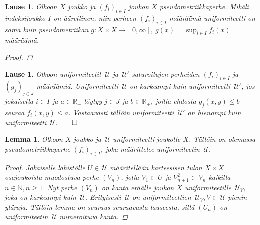 \documentclass[12pt,a4paper,leqno]{report}
\newcommand{\R}{\mathbb{R}}
\newcommand{\N}{\mathbb{N}}
\newcommand{\U}{\,\mathcal{U}}
\newcommand{\Pot}{\mathcal{P}}
\theoremstyle{plain}
\newtheorem{lause}[equation]{Lause}
\newtheorem{lem}[equation]{Lemma}
\theoremstyle{definition}
\theoremstyle{remark}
\begin{document}
\begin{lause}
%
%
Olkoon $X$ joukko ja $(f_i)_{i\in I} $ joukon $X$ pseudometriikkaperhe. 
Mikäli indeksijoukko $I$ on äärellinen, niin perheen $(f_i)_{i\in I}$ määräämä 
uniformiteetti on sama kuin pseudometriikan $g\colon X\times X\rightarrow [0,\infty]$, $g(x)=\sup_{i\in I} f_i(x)$ määräämä.
\begin{proof}
\end{proof}
\end{lause}
\begin{lause}
Olkoon uniformiteetit $\U$ ja $\U'$ saturoitujen perheiden 
$(f_i)_{i\in I}$ ja $(g_j)_{j\in J}$ määräämiä. 
Uniformiteetti $\U$ on karkeampi kuin uniformiteetti $\U'$, 
jos jokaisella $i\in I$ ja $a\in\R_+$ löytyy $j\in J$ ja $b\in\R_+$, 
joilla ehdosta $g_j(x,y)\leq b$ seuraa $f_i(x,y)\leq a$. 
Vastaavasti tällöin uniformiteetti $\U'$ on hienompi kuin uniformiteetti $\U$.$\qed$
\end{lause}
\begin{lem}\label{pseudo_uniformista}
Olkoon $X$ joukko ja $\U$ uniformiteetti joukolle $X$. 
Tällöin on olemassa pseudometriikkaperhe $(f_i)_{i\in I}$, joka määrittelee uniformiteetin $\U$.
\begin{proof}
Jokaiselle lähistölle $U\in\U$ määritellään karteesisen tulon $X\times X$ osajoukoista muodostuva perhe $(V_n)$, 
jolla $V_1\subset U$ ja $V_{n+1}^2\subset V_n$ kaikilla $n\in\N, n\geq 1$. 
Nyt perhe $(V_n)$ on kanta eräälle joukon $X$ uniformiteetille $\U_V$, 
joka on karkeampi kuin $\U$. 
Erityisesti $\U$ on uniformiteettien 
$\U_V,V\in\U$ pienin yläraja. %
Tällöin lemma on seuraus seuraavasta lauseesta, sillä 
$(U_n)$ on uniformiteetin $\U$ numeroituva kanta.
\end{proof}
\end{lem}
\end{document}
